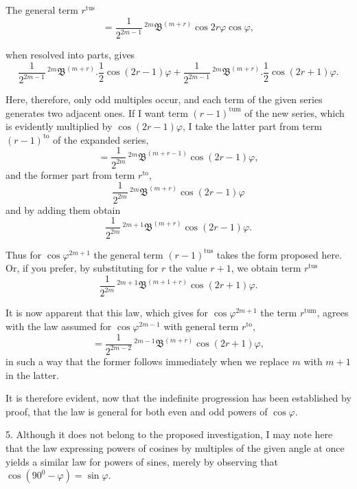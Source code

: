 \par\noindent{}%
\hspace*{\parindent}The general term $r^{\text{tus}}$
\[
= \frac{1}{2^{2m-1}}\,{}^{2m}\mathfrak{B}^{(m+r)}\cos 2r\varphi\cos\varphi,
\]
\par\noindent when resolved into parts, gives
\[
\frac{1}{2^{2m-1}}\,{}^{2m}\mathfrak{B}^{(m+r)} . \frac{1}{2}\cos(2r-1)\varphi
+ \frac{1}{2^{2m-1}}\,{}^{2m}\mathfrak{B}^{(m+r)} . \frac{1}{2}\cos(2r+1)\varphi.
\]

\par\noindent Here, therefore, only odd multiples occur, and each term of the given series generates two adjacent ones. If I want term $(r-1)^{\text{tum}}$ of the new series, which is evidently multiplied by $\cos(2r-1)\varphi$, I take the latter part from term $(r-1)^{\text{to}}$ of the expanded series,
\[
= \frac{1}{2^{2m}}\,{}^{2m}\mathfrak{B}^{(m+r-1)}\cos(2r-1)\varphi,
\]
and the former part from term $r^{\text{to}}$,
\[
\frac{1}{2^{2m}}\,{}^{2m}\mathfrak{B}^{(m+r)}\cos(2r-1)\varphi
\]
and by adding them obtain
\[
\frac{1}{2^{2m}}\,{}^{2m+1}\mathfrak{B}^{(m+r)}\cos(2r-1)\varphi.
\]

\par\noindent Thus for $\cos\varphi^{2m+1}$ the general term $(r-1)^{\text{tus}}$ takes the form proposed here. Or, if you prefer, by substituting for $r$ the value $r+1$, we obtain term
$r^{\text{tus}}$
\[
\frac{1}{2^{2m}}\,{}^{2m+1}\mathfrak{B}^{(m+1+r)}\cos(2r+1)\varphi.
\]

\par\noindent It is now apparent that this law, which gives for $\cos\varphi^{2m+1}$ the term $r^{\text{tum}}$, agrees with the law assumed for $\cos\varphi^{2m-1}$ with general term $r^{\text{to}}$,
\[
= \frac{1}{2^{2m-2}}\,{}^{2m-1}\mathfrak{B}^{(m+r)}\cos(2r+1)\varphi,
\]
in such a way that the former follows immediately when we replace $m$ with $m+1$ in the latter.

\par\noindent\hspace*{\parindent}It is therefore evident, now that the indefinite progression has been established by proof, that the law is general for both even and odd powers of $\cos\varphi$.

5. Although it does not belong to the proposed investigation, I may note here that the law expressing powers of cosines by multiples of the given angle at once yields a similar law for powers of sines, merely by observing that
$\cos(90^0-\varphi) = \sin\varphi$.
